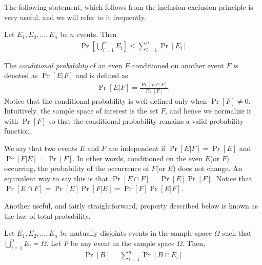 The following statement, which follows from the inclusion-exclusion principle is very useful, and we will refer to it frequently.

\begin{fact}
	Let $E_1, E_2, \ldots, E_n$ be $n$ events. Then
	\begin{align*}
		\Pr\left[\bigcup_{i=1}^n E_i\right] \leq \sum_{i=1}^n \Pr[E_i]
	\end{align*}
\end{fact}

The \emph{conditional probability} of an even $E$ conditioned on another event $F$ is denoted as $\Pr[E | F]$ and is defined as 
\begin{align*}
	\Pr[E|F] = \frac{\Pr[E\cap F]}{\Pr[F]}.
\end{align*}
Notice that the conditional probability is well-defined only when $\Pr[F] \neq 0$. Intuitively, the sample space of interest is the set $F$, and hence we normalize it with $\Pr[F]$ so that the conditional probability remains a valid probability function.

We say that two events $E$ and $F$ are independent if $\Pr[E|F] = \Pr[E]$ and $\Pr[F|E] = \Pr[F]$. In other words, conditioned on the even $E$(or $F$) occurring, the probability of the occurrence of $F$(or $E$) does not change. An equivalent way to say this is that $\Pr[E\cap F] = \Pr[E]\Pr[F]$. Notice that $\Pr[E\cap F] = \Pr[E]\Pr[F|E] = \Pr[F]\Pr[E|F]$. 

Another useful, and fairly straightforward, property described below is known as the law of total probability.

\begin{theorem}
	Let $E_1, E_2, \ldots, E_n$ be mutually disjoints events in the sample space $\Omega$ such that $\bigcup_{i=1}^n E_i = \Omega$. Let $F$ be any event in the sample space $\Omega$. Then,
	\begin{align*}
		\Pr[B] = \sum_{i=1}^n \Pr[B \cap E_i]
	\end{align*}
	\label{thm:tot-prob}
\end{theorem}

